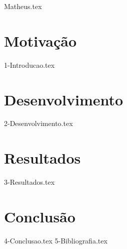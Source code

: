 \documentclass[14pt, oneside]{book}
\begin{document}
    {Matheus.tex}
    \chapter{Motivação}
        {1-Introducao.tex}
    \chapter{Desenvolvimento}
        {2-Desenvolvimento.tex}
    \chapter{Resultados}
        {3-Resultados.tex}
    \chapter{Conclusão}
        {4-Conclusao.tex}
    {5-Bibliografia.tex}
\end{document}
